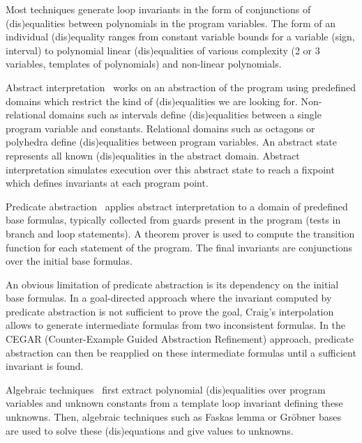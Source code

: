 \documentclass[a4paper,10pt]{article}
\begin{document}
Most techniques generate loop invariants in the form of conjunctions of
(dis)equalities between polynomials in the program variables. The form of an
individual (dis)equality ranges from constant variable bounds for a variable
(sign, interval) to polynomial linear (dis)equalities of various complexity (2
or 3 variables, templates of polynomials) and non-linear polynomials.

Abstract interpretation~\cite{cousot:1978:popl, mine:2006:hosc} works on an
abstraction of the program using predefined domains which restrict the kind of
(dis)equalities we are looking for. Non-relational domains such as intervals
define (dis)equalities between a single program variable and
constants. Relational domains such as octagons or polyhedra define
(dis)equalities between program variables. An abstract state represents all
known (dis)equalities in the abstract domain. Abstract interpretation simulates
execution over this abstract state to reach a fixpoint which defines invariants
at each program point.

Predicate abstraction~\cite{graf:1997:cav} applies abstract interpretation to a
domain of predefined base formulas, typically collected from guards present in
the program (tests in branch and loop statements). A theorem prover is used to
compute the transition function for each statement of the program. The final
invariants are conjunctions over the initial base formulas.

An obvious limitation of predicate abstraction is its dependency on the initial
base formulas. In a goal-directed approach where the invariant computed by
predicate abstraction is not sufficient to prove the goal, Craig's
interpolation~\cite{mcmillan:2003:cav, mcmillan:2006:cav} allows to generate
intermediate formulas from two inconsistent formulas. In the CEGAR
(Counter-Example Guided Abstraction Refinement) approach, predicate abstraction
can then be reapplied on these intermediate formulas until a sufficient
invariant is found.

Algebraic techniques~\cite{colon:2003:cav, sankaranarayanan:2004:popl,
  kovacs:2008:csr} first extract polynomial (dis)equalities over program
variables and unknown constants from a template loop invariant defining these
unknowns. Then, algebraic techniques such as Faskas lemma or Gröbner bases are
used to solve these (dis)equations and give values to unknowns.

\end{document}
